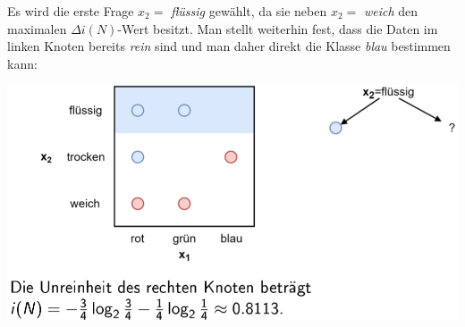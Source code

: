\documentclass{report}
\begin{document}
Es wird die erste Frage $x_2 = $ \textit{flüssig} gewählt, da sie neben $x_2 = $ \textit{weich} den maximalen
$\Delta i(N)$-Wert besitzt. Man stellt weiterhin fest, dass die Daten im linken Knoten bereits \textit{rein}
sind und man daher direkt die Klasse \textit{blau} bestimmen kann:

\begin{center}
  \includegraphics[scale=.3]{ml07_14}
\end{center}
\end{document}
